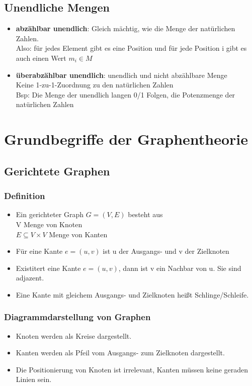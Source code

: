 \documentclass{scrreprt}
\begin{document}
\section{Unendliche Mengen}
\begin{itemize}
    \item \textbf{abzählbar unendlich}: Gleich mächtig, wie die Menge der natürlichen Zahlen.
    \\Also: für jedes Element gibt es eine Position und für jede Position i gibt es auch einen Wert $m_{i} \in M$
    \item \textbf{überabzählbar unendlich}: unendlich und nicht abzählbare Menge
    \\Keine 1-zu-1-Zuordnung zu den natürlichen Zahlen
    \\Bsp: Die Menge der unendlich langen 0/1 Folgen, die Potenzmenge der natürlichen Zahlen
\end{itemize}
\pagebreak
\chapter{Grundbegriffe der Graphentheorie}
\section{Gerichtete Graphen}
\subsection{Definition}
\begin{itemize}
    \item Ein gerichteter Graph $G = (V,E)$ besteht aus
    \\V \hspace{1,5cm} Menge von Knoten
    \\$E \subseteq V \times V$ Menge von Kanten
    \item Für eine Kante $e = (u,v)$ ist u der Ausgangs- und v der Zielknoten
    \item Existitert eine Kante $e = (u,v)$, dann ist v ein Nachbar von u. Sie sind adjazent.
    \item Eine Kante mit gleichem Ausgangs- und Zielknoten heißt Schlinge/Schleife.
\end{itemize}
\subsection{Diagrammdarstellung von Graphen}
\begin{itemize}
    \item Knoten werden als Kreise dargestellt.
    \item Kanten werden als Pfeil vom Ausgangs- zum Zielknoten dargestellt.
    \item Die Positionierung von Knoten ist irrelevant, Kanten müssen keine geraden Linien sein.
\end{itemize}
\end{document}
